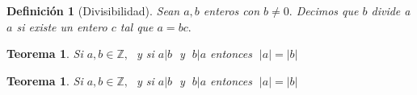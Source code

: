 \documentclass{book}
\newcommand{\Z}{\mathbb{Z}} %
\theoremstyle{estiloB}
\newtheorem{unadefiB}{Definición}[chapter]
\newtheorem{unteoB}{Teorema}[section]
\theoremstyle{estiloC}
\newtheorem{unteoC}{Teorema}
\begin{document}
	\begin{unadefiB}[Divisibilidad]\label{divisibilidad}
		Sean $a,b$ enteros con $b \not = 0.$ Decimos que $b$ divide a $a$
		si existe un entero $c$ tal que $a=bc.$
	\end{unadefiB}
	\begin{unteoB}
		Si $a,b \in \Z,\;$ y si $a|b\;$ y $\;b|a$ entonces $\;|a|=|b|$
	\end{unteoB}
	\begin{unteoC}
		Si $a,b \in \Z,\;$ y si $a|b\;$ y $\;b|a$ entonces $\;|a|=|b|$

\end{unteoC}
\end{document}
